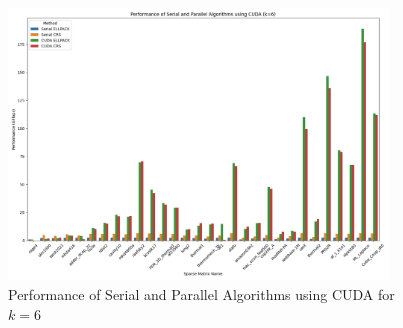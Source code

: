 \documentclass[12pt,oneside]{book} %
\begin{document}
\begin{figure}[H]
    \centering
    \includegraphics[width=0.9\textwidth]{../results/images/CUDA_Performance_k6.png}
    \caption{Performance of Serial and Parallel Algorithms using CUDA for $k=6$}
    \label{fig:cuda-performance-k6}
\end{figure}
\end{document}
